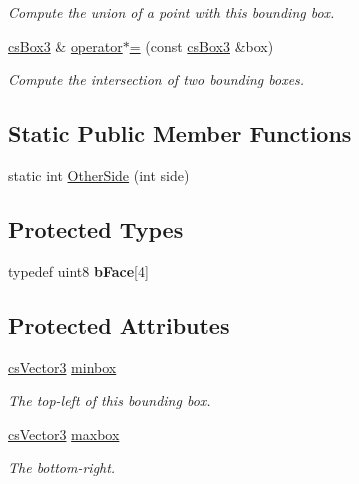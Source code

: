 \begin{DoxyCompactItemize}
\begin{DoxyCompactList}\small\item\em Compute the union of a point with this bounding box. \end{DoxyCompactList}\item 
\hyperlink{classcsBox3}{cs\+Box3} \& \hyperlink{classcsBox3_a1c65f5be2cb89647cb94b9f81bffad21}{operator$\ast$=} (const \hyperlink{classcsBox3}{cs\+Box3} \&box)\hypertarget{classcsBox3_a1c65f5be2cb89647cb94b9f81bffad21}{}\label{classcsBox3_a1c65f5be2cb89647cb94b9f81bffad21}

\begin{DoxyCompactList}\small\item\em Compute the intersection of two bounding boxes. \end{DoxyCompactList}\end{DoxyCompactItemize}
\subsection*{Static Public Member Functions}
\begin{DoxyCompactItemize}
\item 
static int \hyperlink{classcsBox3_ad62b3cb9b9765edd9146eadc2f5ed2de}{Other\+Side} (int side)
\end{DoxyCompactItemize}
\subsection*{Protected Types}
\begin{DoxyCompactItemize}
\item 
typedef uint8 {\bfseries b\+Face}\mbox{[}4\mbox{]}\hypertarget{classcsBox3_afe14501543994e0e1c0b61e0d29213f8}{}\label{classcsBox3_afe14501543994e0e1c0b61e0d29213f8}

\end{DoxyCompactItemize}
\subsection*{Protected Attributes}
\begin{DoxyCompactItemize}
\item 
\hyperlink{classcsVector3}{cs\+Vector3} \hyperlink{classcsBox3_a587f32cdcb29f9b068df8b6c873d4f87}{minbox}\hypertarget{classcsBox3_a587f32cdcb29f9b068df8b6c873d4f87}{}\label{classcsBox3_a587f32cdcb29f9b068df8b6c873d4f87}

\begin{DoxyCompactList}\small\item\em The top-\/left of this bounding box. \end{DoxyCompactList}\item 
\hyperlink{classcsVector3}{cs\+Vector3} \hyperlink{classcsBox3_a400fc087f1cf85700dec0f1d48e2842b}{maxbox}\hypertarget{classcsBox3_a400fc087f1cf85700dec0f1d48e2842b}{}\label{classcsBox3_a400fc087f1cf85700dec0f1d48e2842b}

\begin{DoxyCompactList}\small\item\em The bottom-\/right. \end{DoxyCompactList}\end{DoxyCompactItemize}
